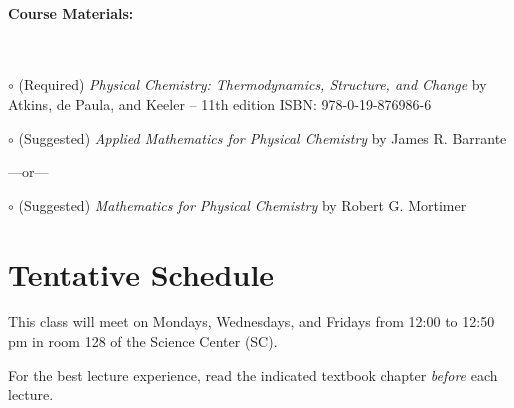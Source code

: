 \documentclass[12pt, letterpaper]{article}
\begin{document}
\paragraph{Course Materials:} ~

$\circ$ (Required) \emph{Physical Chemistry: Thermodynamics, Structure, and Change} by Atkins, de Paula, and Keeler -- 11th edition ISBN: 978-0-19-876986-6

$\circ$ (Suggested) \emph{Applied Mathematics for Physical Chemistry} by James R. Barrante

\vspace{-4pt}
---or---

\vspace{-4pt}
$\circ$ (Suggested) \emph{Mathematics for Physical Chemistry} by Robert G. Mortimer


\section*{Tentative Schedule}
This class will meet on Mondays, Wednesdays, and Fridays from 12:00 to 12:50 pm in room 128 of the Science Center (SC).

\noindent For the best lecture experience, read the indicated textbook chapter \emph{before} each lecture.
\end{document}
